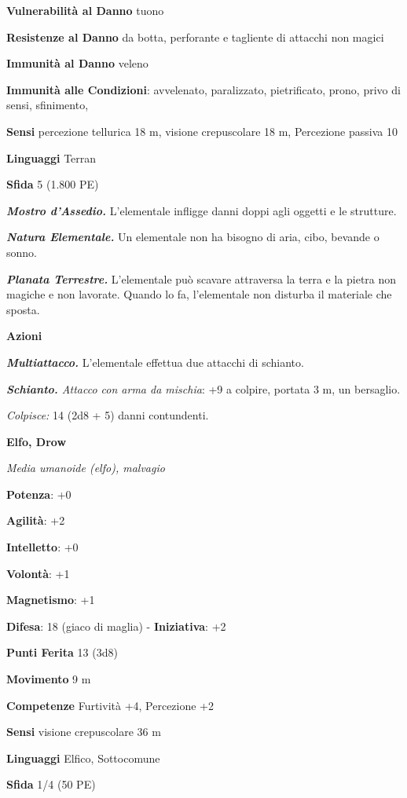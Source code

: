 \begin{multicols}{2}
\textbf{Vulnerabilità al Danno} tuono

\textbf{Resistenze al Danno} da botta, perforante e tagliente di
attacchi non magici

\textbf{Immunità al Danno} veleno

\textbf{Immunità alle Condizioni}: avvelenato, paralizzato, pietrificato,
prono, privo di sensi, sfinimento,

\textbf{Sensi} percezione tellurica 18 m, visione crepuscolare 18 m, Percezione
passiva 10

\textbf{Linguaggi} Terran

\textbf{Sfida} 5 (1.800 PE)\smallskip

\emph{\textbf{Mostro d'Assedio.}} L'elementale infligge danni doppi agli
oggetti e le strutture.

\emph{\textbf{Natura Elementale.}} Un elementale non ha bisogno di aria,
cibo, bevande o sonno.

\emph{\textbf{Planata Terrestre.}} L'elementale può scavare attraversa
la terra e la pietra non magiche e non lavorate. Quando lo fa,
l'elementale non disturba il materiale che sposta.

\smallskip\textbf{Azioni}

\emph{\textbf{Multiattacco.}} L'elementale effettua due attacchi di
schianto.

\emph{\textbf{Schianto.} Attacco con arma da mischia}: +9 a colpire,
portata 3 m, un bersaglio.

\emph{Colpisce:} 14 (2d8 + 5) danni contundenti.

\textbf{Elfo, Drow}

\emph{Media umanoide (elfo), malvagio}

\textbf{Potenza}: +0

\textbf{Agilità}: +2

\textbf{Intelletto}: +0

\textbf{Volontà}: +1

\textbf{Magnetismo}: +1

\textbf{Difesa}: 18 (giaco di maglia) - \textbf{Iniziativa}: +2

\textbf{Punti Ferita} 13 (3d8)

\textbf{Movimento} 9 m

\textbf{Competenze} Furtività +4, Percezione +2

\textbf{Sensi} visione crepuscolare 36 m

\textbf{Linguaggi} Elfico, Sottocomune

\textbf{Sfida} 1/4 (50 PE)\smallskip


\end{multicols}
